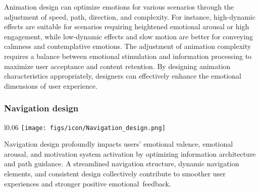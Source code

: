 Animation design can optimize emotions for various scenarios through the adjustment of speed, path, direction, and complexity. For instance, high-dynamic effects are suitable for scenarios requiring heightened emotional arousal or high engagement, while low-dynamic effects and slow motion are better for conveying calmness and contemplative emotions. The adjustment of animation complexity requires a balance between emotional stimulation and information processing to maximize user acceptance and content retention. By designing animation characteristics appropriately, designers can effectively enhance the emotional dimensions of user experience.

\subsubsection{Navigation design}
\begin{wrapfigure}{l}{0.06\textwidth}
  \vspace{-11pt} %
        \texttt{[image: figs/icon/Navigation\_design.png]}
\end{wrapfigure} 
Navigation design profoundly impacts users’ emotional valence, emotional arousal, and motivation system activation by optimizing information architecture and path guidance. A streamlined navigation structure, dynamic navigation elements, and consistent design collectively contribute to smoother user experiences and stronger positive emotional~feedback.

